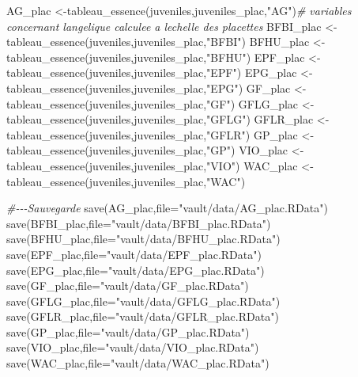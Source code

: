\documentclass[
  12pt,
  american,
  a4paper,
  extrafontsizes,onecolumn,openright
  ]{memoir}
\newenvironment{Shaded}{\begin{snugshade}}{\end{snugshade}}
\newcommand{\AttributeTok}[1]{\textcolor[rgb]{0.77,0.63,0.00}{#1}}
\newcommand{\CommentTok}[1]{\textcolor[rgb]{0.56,0.35,0.01}{\textit{#1}}}
\newcommand{\FunctionTok}[1]{\textcolor[rgb]{0.00,0.00,0.00}{#1}}
\newcommand{\NormalTok}[1]{#1}
\newcommand{\OtherTok}[1]{\textcolor[rgb]{0.56,0.35,0.01}{#1}}
\newcommand{\StringTok}[1]{\textcolor[rgb]{0.31,0.60,0.02}{#1}}
\begin{document}
\begin{Shaded}
\begin{Highlighting}[]
\NormalTok{AG\_plac }\OtherTok{\textless{}{-}}\FunctionTok{tableau\_essence}\NormalTok{(juveniles,juveniles\_plac,}\StringTok{"AG"}\NormalTok{)}\CommentTok{\# variables concernant l\textquotesingle{}angelique calculee a l\textquotesingle{}echelle des placettes}
\NormalTok{BFBI\_plac }\OtherTok{\textless{}{-}}\FunctionTok{tableau\_essence}\NormalTok{(juveniles,juveniles\_plac,}\StringTok{"BFBI"}\NormalTok{)}
\NormalTok{BFHU\_plac }\OtherTok{\textless{}{-}}\FunctionTok{tableau\_essence}\NormalTok{(juveniles,juveniles\_plac,}\StringTok{"BFHU"}\NormalTok{)}
\NormalTok{EPF\_plac }\OtherTok{\textless{}{-}}\FunctionTok{tableau\_essence}\NormalTok{(juveniles,juveniles\_plac,}\StringTok{"EPF"}\NormalTok{)}
\NormalTok{EPG\_plac }\OtherTok{\textless{}{-}}\FunctionTok{tableau\_essence}\NormalTok{(juveniles,juveniles\_plac,}\StringTok{"EPG"}\NormalTok{)}
\NormalTok{GF\_plac }\OtherTok{\textless{}{-}}\FunctionTok{tableau\_essence}\NormalTok{(juveniles,juveniles\_plac,}\StringTok{"GF"}\NormalTok{)}
\NormalTok{GFLG\_plac }\OtherTok{\textless{}{-}}\FunctionTok{tableau\_essence}\NormalTok{(juveniles,juveniles\_plac,}\StringTok{"GFLG"}\NormalTok{)}
\NormalTok{GFLR\_plac }\OtherTok{\textless{}{-}}\FunctionTok{tableau\_essence}\NormalTok{(juveniles,juveniles\_plac,}\StringTok{"GFLR"}\NormalTok{)}
\NormalTok{GP\_plac }\OtherTok{\textless{}{-}}\FunctionTok{tableau\_essence}\NormalTok{(juveniles,juveniles\_plac,}\StringTok{"GP"}\NormalTok{)}
\NormalTok{VIO\_plac }\OtherTok{\textless{}{-}}\FunctionTok{tableau\_essence}\NormalTok{(juveniles,juveniles\_plac,}\StringTok{"VIO"}\NormalTok{)}
\NormalTok{WAC\_plac }\OtherTok{\textless{}{-}}\FunctionTok{tableau\_essence}\NormalTok{(juveniles,juveniles\_plac,}\StringTok{"WAC"}\NormalTok{)}




\CommentTok{\#{-}{-}{-}Sauvegarde}
\FunctionTok{save}\NormalTok{(AG\_plac,}\AttributeTok{file=}\StringTok{"vault/data/AG\_plac.RData"}\NormalTok{)}
\FunctionTok{save}\NormalTok{(BFBI\_plac,}\AttributeTok{file=}\StringTok{"vault/data/BFBI\_plac.RData"}\NormalTok{)}
\FunctionTok{save}\NormalTok{(BFHU\_plac,}\AttributeTok{file=}\StringTok{"vault/data/BFHU\_plac.RData"}\NormalTok{)}
\FunctionTok{save}\NormalTok{(EPF\_plac,}\AttributeTok{file=}\StringTok{"vault/data/EPF\_plac.RData"}\NormalTok{)}
\FunctionTok{save}\NormalTok{(EPG\_plac,}\AttributeTok{file=}\StringTok{"vault/data/EPG\_plac.RData"}\NormalTok{)}
\FunctionTok{save}\NormalTok{(GF\_plac,}\AttributeTok{file=}\StringTok{"vault/data/GF\_plac.RData"}\NormalTok{)}
\FunctionTok{save}\NormalTok{(GFLG\_plac,}\AttributeTok{file=}\StringTok{"vault/data/GFLG\_plac.RData"}\NormalTok{)}
\FunctionTok{save}\NormalTok{(GFLR\_plac,}\AttributeTok{file=}\StringTok{"vault/data/GFLR\_plac.RData"}\NormalTok{)}
\FunctionTok{save}\NormalTok{(GP\_plac,}\AttributeTok{file=}\StringTok{"vault/data/GP\_plac.RData"}\NormalTok{)}
\FunctionTok{save}\NormalTok{(VIO\_plac,}\AttributeTok{file=}\StringTok{"vault/data/VIO\_plac.RData"}\NormalTok{)}
\FunctionTok{save}\NormalTok{(WAC\_plac,}\AttributeTok{file=}\StringTok{"vault/data/WAC\_plac.RData"}\NormalTok{)}
\end{Highlighting}
\end{Shaded}
\end{document}
